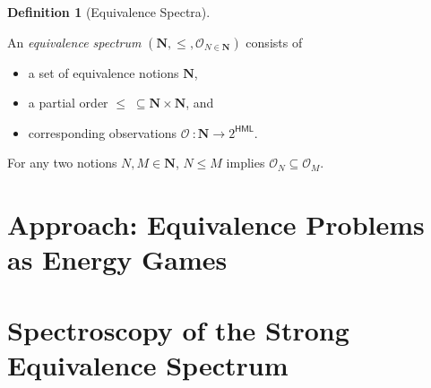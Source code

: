 \documentclass[
  a4paper,
]{report}
\providecommand{\tightlist}{%
  \setlength{\itemsep}{0pt}\setlength{\parskip}{0pt}}\usepackage{longtable,booktabs,array}
\theoremstyle{plain}
\theoremstyle{plain}
\theoremstyle{definition}
\newtheorem{definition}{Definition}[section]
\theoremstyle{plain}
\theoremstyle{definition}
\theoremstyle{remark}
\begin{document}
\begin{definition}[Equivalence
Spectra]\protect\hypertarget{def-spectrum}{}\label{def-spectrum}

An \emph{equivalence spectrum}
\((\mathbf{N}, \leq, \mathcal{O}_{N \in \mathbf{N}})\) consists of

\begin{itemize}
\tightlist
\item
  a set of equivalence notions \(\mathbf{N}\),
\item
  a partial order \(\leq \; \subseteq \mathbf{N}\times \mathbf{N}\), and
\item
  corresponding observations
  \(\mathcal{O}_{} \, \colon \mathbf{N}\to 2^{\textsf{HML}}\).
\end{itemize}

For any two notions \(N,M \in \mathbf{N}\), \(N \leq M\) implies
\(\mathcal{O}_{N} \subseteq \mathcal{O}_{M}\).

\end{definition}


\chapter{Approach: Equivalence Problems as Energy
Games}\label{approach-equivalence-problems-as-energy-games}


\chapter{Spectroscopy of the Strong Equivalence
Spectrum}\label{spectroscopy-of-the-strong-equivalence-spectrum}

\providecommand{\lc}[1]{}

\providecommand{\inverse}[1]{#1^{-1}}
\providecommand{\setminus}{\mathbin{\backslash}}
\providecommand{\powerset}[1]{2^{#1}}
\providecommand{\defiff}{\mathrel{:\!\iff}}
\providecommand{\set}[1]{\{#1\}}
\providecommand{\emptyword}{\texttt{()}}
\providecommand{\identity}[1]{\mathrm{id}_{#1}}

\providecommand{\step}[1]{\xrightarrow{#1}}
\providecommand{\states}{\mathcal{P}}
\providecommand{\system}{\mathcal{S}}
\providecommand{\labels}{\mathcal{L}}
\providecommand{\actions}{\Sigma}
\providecommand{\traces}[1]{\mathsf{Traces}(#1)}

\providecommand{\literal}[1]{\mathsf{#1}}
\end{document}
